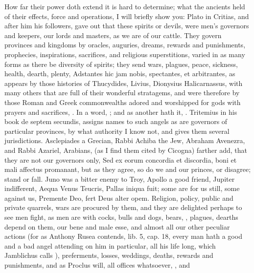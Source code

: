 {{How far their power doth extend it is hard to determine; what the
ancients held of their effects, force and operations, I will briefly
show you: Plato in Critias, and after him his followers, gave out that
these spirits or devils, were men's governors and keepers, our lords
and masters, as we are of our cattle. They govern provinces and
kingdoms by oracles, auguries, dreams, rewards and punishments,
prophecies, inspirations, sacrifices, and religious superstitions,
varied in as many forms as there be diversity of spirits; they send
wars, plagues, peace, sickness, health, dearth, plenty, Adstantes
hic jam nobis, spectantes, et arbitrantes, \etc{} as appears by those
histories of Thucydides, Livius, Dionysius Halicarnassus, with many
others that are full of their wonderful stratagems, and were therefore
by those Roman and Greek commonwealths adored and worshipped for gods
with prayers and sacrifices, \etc{}. In a word, ; and as another hath it, . Tritemius in his book de
septem secundis, assigns names to such angels as are governors of
particular provinces, by what authority I know not, and gives them
several jurisdictions. Asclepiades a Grecian, Rabbi Achiba the Jew,
Abraham Avenezra, and Rabbi Azariel, Arabians, (as I find them cited by
Cicogna) farther add, that they are not our governors only, Sed
ex eorum concordia et discordia, boni et mali affectus promanant, but
as they agree, so do we and our princes, or disagree; stand or fall.
Juno was a bitter enemy to Troy, Apollo a good friend, Jupiter
indifferent, Aequa Venus Teucris, Pallas iniqua fuit; some are for us
still, some against us, Premente Deo, fert Deus alter opem. Religion,
policy, public and private quarrels, wars are procured by them, and
they are delighted perhaps to see men fight, as men are with
cocks, bulls and dogs, bears, \etc{}, plagues, dearths depend on them, our
bene and male esse, and almost all our other peculiar actions (for as
Anthony Rusea contends, lib. 5, cap. 18, every man hath a good and a
bad angel attending on him in particular, all his life long, which
Jamblichus calls ), preferments, losses, weddings, deaths,
rewards and punishments, and as Proclus will, all offices
whatsoever, , \etc{} and
}}
